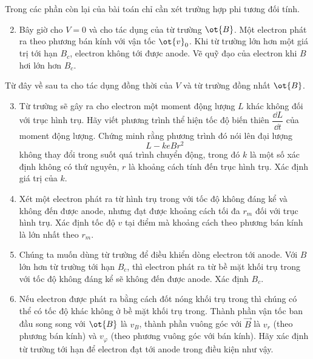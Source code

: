 \begin{vd}
    Trong các phần còn lại của bài toán chỉ cần xét trường hợp phi tương đối tính.\\
    \begin{enumerate}[1)]
    \setcounter{enumi}{1}
    \item Bây giờ cho $V =0 $ và cho tác dụng của từ trường $\ot{B}$. Một electron phát ra theo phương bán kính với vận tốc $\ot{v}_{0}$. Khi từ trường lớn hơn một giá trị tới hạn $B_{c}$, electron không tới được anode. Vẽ quỹ đạo của electron khi $B$ hơi lớn hơn $B_{c}$.\\
\end{enumerate}
    Từ đây về sau ta cho tác dụng đồng thời của $V$ và từ trường đồng nhất $\ot{B}$.\\
    \begin{enumerate}[1)]
    \setcounter{enumi}{2}
    \item Từ trường sẽ gây ra cho electron một moment động lượng $L$ khác không đối với trục hình trụ. Hãy viết phương trình thể hiện tốc độ biến thiên $\dfrac{\dd L}{\dd t}$ của moment động lượng. Chứng minh rằng phương trình đó nói lên đại lượng \[L - keBr^2\] không thay đổi trong suốt quá trình chuyển động, trong đó $k$ là một số xác định không có thứ nguyên, $r$ là khoảng cách tính đến trục hình trụ. Xác định giá trị của $k$.
    \item Xét một electron phát ra từ hình trụ trong với tốc độ không đáng kể và không đến được anode, nhưng đạt được khoảng cách tối đa $r_m$ đối với trục hình trụ. Xác định tốc độ $v$ tại điểm mà khoảng cách theo phương bán kính là lớn nhất theo $r_{m}$.
    \item Chúng ta muốn dùng từ trường để điều khiển dòng electron tới anode. Với $B$ lớn hơn từ trường tới hạn $B_{c}$, thì electron phát ra từ bề mặt khối trụ trong với tốc độ không đáng kể sẽ không đến được anode. Xác định ${B}_{{c}}$. 
    \item Nếu electron được phát ra bằng cách đốt nóng khối trụ trong thì chúng có thể có tốc độ khác không ở bề mặt khối trụ trong. Thành phần vận tốc ban đầu song song với $\ot{B}$ là $v_{B}$, thành phần vuông góc với $\overrightarrow{{B}}$ là ${v}_{r}$ (theo phương bán kính) và ${v}_{\varphi}$ (theo phương vuông góc với bán kính). Hãy xác định từ trường tới hạn để electron đạt tới anode trong điều kiện như vậy.
\end{enumerate}
\end{vd}
